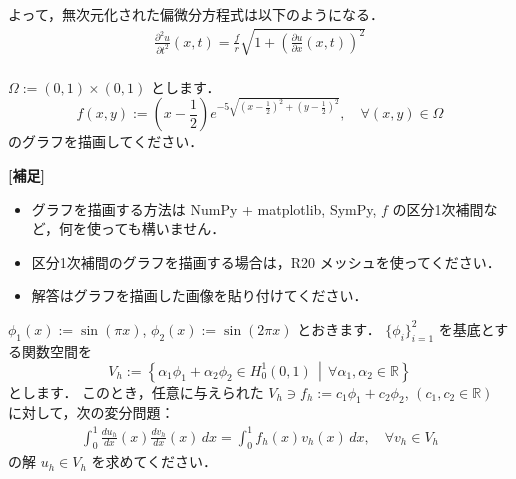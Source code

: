 \documentclass{jarticle}
\newcommand{\prob}[1]{\fbox{\Large \,#1\,}}
\begin{document}
よって，無次元化された偏微分方程式は以下のようになる．
\begin{eqnarray}
  \frac{\partial^2 u}{\partial t^2}(x,t) = \frac{f}{r} \sqrt{1 + \left( \frac{\partial u}{\partial x}(x,t) \right)^2}
  \label{noDim}
\end{eqnarray}
\\
\prob{2} $\Omega := (0,1) \times (0,1)$ とします．
\[ f(x,y) := \left(x-\frac{1}{2}\right)e^{-5\sqrt{\left(x-\frac{1}{2}\right)^2+\left(y-\frac{1}{2}\right)^2}}, \quad \forall (x,y) \in \Omega \]
のグラフを描画してください．

\textbf{[補足]}
\begin{itemize}
\item グラフを描画する方法は NumPy + matplotlib, SymPy, $f$ の区分1次補間など，何を使っても構いません．
\item 区分1次補間のグラフを描画する場合は，R20 メッシュを使ってください．
\item 解答はグラフを描画した画像を貼り付けてください．
\end{itemize}
\prob{3} $\phi_1(x) := \sin(\pi x)$, $\phi_2(x) := \sin(2 \pi x)$ とおきます．
$\{\phi_i\}_{i=1}^2$ を基底とする関数空間を
\[ V_h := \left\{\alpha_1\phi_1+\alpha_2\phi_2 \in H_0^1(0,1) \,\middle|\, \forall \alpha_1,\alpha_2 \in \mathbb{R}\right\} \]
とします．
このとき，任意に与えられた $V_h \ni f_h := c_1\phi_1 + c_2\phi_2$, $(c_1,c_2 \in \mathbb{R})$ に対して，次の変分問題：
\begin{align}
\int_0^1\frac{du_h}{dx}(x)\frac{dv_h}{dx}(x)\,dx = \int_0^1f_h(x)v_h(x)\,dx, \quad \forall v_h \in V_h \label{prob3}
\end{align}
の解 $u_h \in V_h$ を求めてください．
\end{document}
